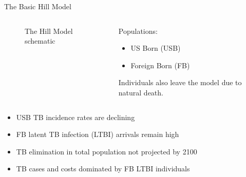\documentclass[final]{beamer}
\begin{document}
\begin{frame}
\begin{columns}[T]
\begin{column}{.3\textwidth}
\begin{block}{The Basic Hill Model}
\begin{columns}[T]
\begin{column}{.5\textwidth}
\begin{figure}[h]
\begin{center}
              \end{center}
              \caption{The Hill Model schematic}
              \label{fig:hillFlow}
            \end{figure}
          \end{column}
          \begin{column}{.45\textwidth}
              \vspace{1.5em}
            Populations:
            \begin{itemize}
              \item US Born (USB) 
              \item Foreign Born (FB)
            \end{itemize}
            Individuals also leave the model due to natural death.
          \end{column}
        \end{columns}
        \vspace{0.6em}
        \begin{itemize}
          \item USB TB incidence rates are declining
          \item FB latent TB infection (LTBI) arrivals remain high
          \item TB elimination in total population not projected by 2100
          \item TB cases and costs dominated by FB LTBI individuals
        \end{itemize}
        \vspace{0,6em}
        \begin{columns}[T]
          \begin{column}{.47\textwidth}
            \begin{figure}[h]
              \begin{center}

\end{center}
\end{figure}
\end{column}
\end{columns}
\end{block}
\end{column}
\end{columns}
\end{frame}
\end{document}
